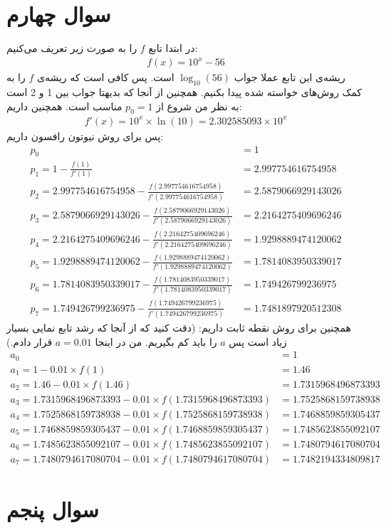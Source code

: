 \documentclass[]{article}
\begin{document}
\section*{سوال چهارم}
در ابتدا تابع $f$
را به صورت زیر تعریف می‌کنیم:
\begin{gather*}
    f(x) = 10^x - 56
\end{gather*}
ریشه‌ی این تابع عملا جواب
$\log_{10}(56)$
است. پس کافی است که ریشه‌ی
$f$
را به کمک روش‌های خواسته شده پیدا بکنیم. همچنین از آنجا که بدیهتا جواب بین 1 و 2 است به نظر من شروع از
$p_0 = 1$
مناسب است. همچنین داریم:
\begin{gather*}
    f'(x) = 10^x \times \ln(10) = 2.302585093 \times 10^x
\end{gather*}
پس برای روش نیوتون رافسون داریم:
\begin{align*}
    p_{0} &= 1\\
    p_{1} = 1 - \frac{f(1)}{f'(1)} &= 2.997754616754958\\
    p_{2} = 2.997754616754958 - \frac{f(2.997754616754958)}{f'(2.997754616754958)} &= 2.5879066929143026\\
    p_{3} = 2.5879066929143026 - \frac{f(2.5879066929143026)}{f'(2.5879066929143026)} &= 2.2164275409696246\\
    p_{4} = 2.2164275409696246 - \frac{f(2.2164275409696246)}{f'(2.2164275409696246)} &= 1.9298889474120062\\
    p_{5} = 1.9298889474120062 - \frac{f(1.9298889474120062)}{f'(1.9298889474120062)} &= 1.7814083950339017\\
    p_{6} = 1.7814083950339017 - \frac{f(1.7814083950339017)}{f'(1.7814083950339017)} &= 1.749426799236975\\
    p_{7} = 1.749426799236975 - \frac{f(1.749426799236975)}{f'(1.749426799236975)} &= \boxed{1.7481897920512308}
\end{align*}
همچنین برای روش نقطه ثابت داریم:
(دقت کنید که از آنجا که رشد تابع نمایی بسیار زیاد است پس $a$ را باید کم بگیریم. من در اینجا $a=0.01$ قرار دادم.)
\begin{align*}
    a_{0} &= 1\\
    a_{1} = 1 - 0.01 \times f(1) &= 1.46\\
    a_{2} = 1.46 - 0.01 \times f(1.46) &= 1.7315968496873393\\
    a_{3} = 1.7315968496873393 - 0.01 \times f(1.7315968496873393) &= 1.7525868159738938\\
    a_{4} = 1.7525868159738938 - 0.01 \times f(1.7525868159738938) &= 1.7468859859305437\\
    a_{5} = 1.7468859859305437 - 0.01 \times f(1.7468859859305437) &= 1.7485623855092107\\
    a_{6} = 1.7485623855092107 - 0.01 \times f(1.7485623855092107) &= 1.7480794617080704\\
    a_{7} = 1.7480794617080704 - 0.01 \times f(1.7480794617080704) &= \boxed{1.7482194334809817}
\end{align*}
\section*{سوال پنجم}
\end{document}
